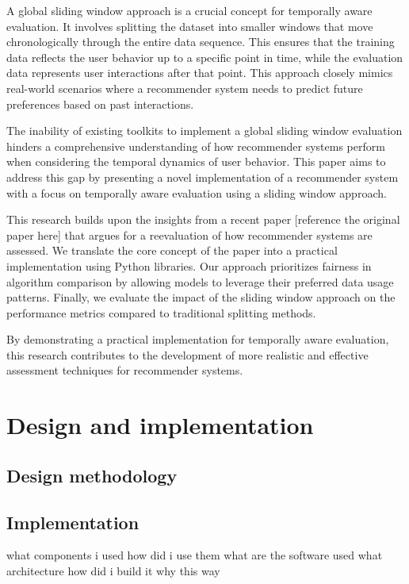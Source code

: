 \documentclass{article}
\begin{document}
A global sliding window approach is a crucial concept for temporally aware
evaluation. It involves splitting the dataset into smaller windows that move
chronologically through the entire data sequence. This ensures that the
training data reflects the user behavior up to a specific point in time, while
the evaluation data represents user interactions after that point. This
approach closely mimics real-world scenarios where a recommender system needs
to predict future preferences based on past interactions.

The inability of existing toolkits to implement a global sliding window
evaluation hinders a comprehensive understanding of how recommender systems
perform when considering the temporal dynamics of user behavior. This paper
aims to address this gap by presenting a novel implementation of a recommender
system with a focus on temporally aware evaluation using a sliding window
approach.

This research builds upon the insights from a recent paper [reference the
                original paper here] that argues for a reevaluation of how recommender systems
are assessed. We translate the core concept of the paper into a practical
implementation using Python libraries. Our approach prioritizes fairness in
algorithm comparison by allowing models to leverage their preferred data usage
patterns. Finally, we evaluate the impact of the sliding window approach on the
performance metrics compared to traditional splitting methods.

By demonstrating a practical implementation for temporally aware evaluation,
this research contributes to the development of more realistic and effective
assessment techniques for recommender systems.

\section{Design and implementation}

\subsection*{Design methodology}

\subsection*{Implementation}

what components i used how did i use them what are the software used what
architecture how did i build it why this way
\end{document}
